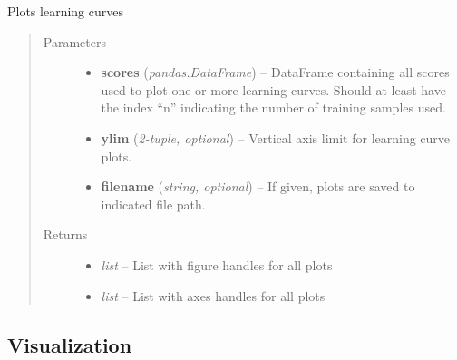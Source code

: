 \documentclass[letterpaper,10pt,english]{sphinxmanual}
\begin{document}

\begin{fulllineitems}
\label{classification:flamingo.classification.test.plot_learning_curve}
Plots learning curves
\begin{quote}\begin{description}
\item[{Parameters}] \leavevmode\begin{itemize}
\item {} 
\textbf{scores} (\emph{pandas.DataFrame}) -- DataFrame containing all scores used to plot one or more learning curves.
Should at least have the index ``n'' indicating the number of training samples
used.

\item {} 
\textbf{ylim} (\emph{2-tuple, optional}) -- Vertical axis limit for learning curve plots.

\item {} 
\textbf{filename} (\emph{string, optional}) -- If given, plots are saved to indicated file path.

\end{itemize}

\item[{Returns}] \leavevmode
\begin{itemize}
\item {} 
\emph{list} --
List with figure handles for all plots

\item {} 
\emph{list} --
List with axes handles for all plots

\end{itemize}


\end{description}\end{quote}

\end{fulllineitems}



\subsection{Visualization}
\label{classification:visualization}\label{classification:module-flamingo.classification.plot}
\end{document}
